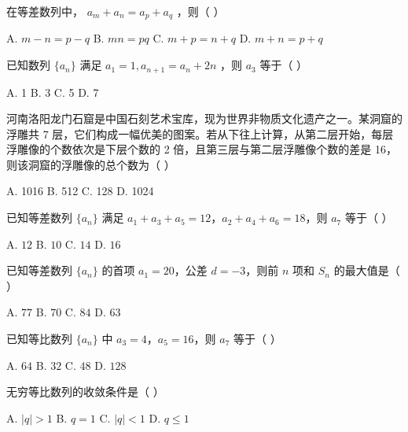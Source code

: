 \documentclass[11pt, a4paper]{article}
\begin{document}
\begin{baitap}[6]
在等差数列中， $a_m + a_n = a_p + a_q$ ，则（ ）
\par\vspace{3pt}
\noindent A. $m - n = p - q$ \quad B. $mn = pq$ \quad C. $m + p = n + q$ \quad D. $m + n = p + q$
\end{baitap}

\begin{baitap}[7]
已知数列 $\{a_n\}$ 满足 $a_1 = 1, a_{n+1} = a_n + 2n$ ，则 $a_3$ 等于（ ）
\par\vspace{3pt}
\noindent A. 1 \quad B. 3 \quad C. 5 \quad D. 7
\end{baitap}

\begin{baitap}[8]
河南洛阳龙门石窟是中国石刻艺术宝库，现为世界非物质文化遗产之一。某洞窟的浮雕共 7 层，它们构成一幅优美的图案。若从下往上计算，从第二层开始，每层浮雕像的个数依次是下层个数的 2 倍，且第三层与第二层浮雕像个数的差是 16，则该洞窟的浮雕像的总个数为（ ）
\par\vspace{3pt}
\noindent A. 1016 \quad B. 512 \quad C. 128 \quad D. 1024
\end{baitap}

\begin{baitap}[9]
已知等差数列 $\{a_n\}$ 满足 $a_1 + a_3 + a_5 = 12$，$a_2 + a_4 + a_6 = 18$，则 $a_7$ 等于（ ）
\par\vspace{3pt}
\noindent A. $12$ \quad B. $10$ \quad C. $14$ \quad D. $16$
\end{baitap}

\begin{baitap}[10]
已知等差数列 $\{a_n\}$ 的首项 $a_1 = 20$，公差 $d = -3$，则前 $n$ 项和 $S_n$ 的最大值是（ ）
\par\vspace{3pt}
\noindent A. $77$ \quad B. $70$ \quad C. $84$ \quad D. $63$
\end{baitap}

\begin{baitap}[11]
已知等比数列 $\{a_n\}$ 中 $a_3 = 4$，$a_5 = 16$，则 $a_7$ 等于（ ）
\par\vspace{3pt}
\noindent A. $64$ \quad B. $32$ \quad C. $48$ \quad D. $128$
\end{baitap}

\begin{baitap}[12]
无穷等比数列的收敛条件是（ ）
\par\vspace{3pt}
\noindent A. $|q| > 1$ \quad B. $q = 1$ \quad C. $|q| < 1$ \quad D. $q \le 1$
\end{baitap}
\end{document}
